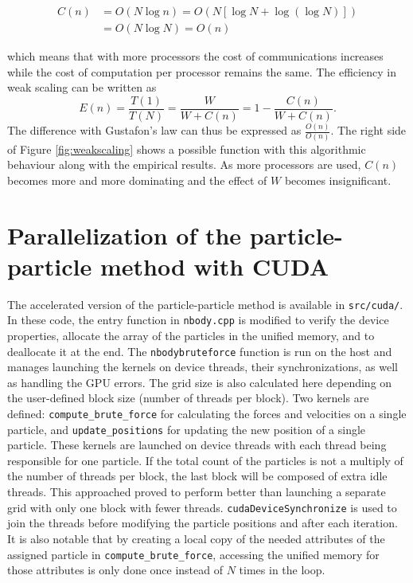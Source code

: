 \documentclass[10pt,journal,compsocconf]{IEEEtran}
\newcommand{\code}[1]{{\small \texttt{#1}}}
\begin{document}
\begin{equation*}
  \begin{aligned}
    C(n) & = O(N \log n) = O(N [\log N + \log(\log N)]) \\
    & = O(N \log N) = O(n)
  \end{aligned}
\end{equation*}

which means that with more processors the cost of communications increases while the cost of computation per processor remains the same. The efficiency in weak scaling can be written as
\begin{equation*}
  E(n) = \frac{T(1)}{T(N)} = \frac{W}{W + C(n)} = 1 - \frac{C(n)}{W + C(n)}.
\end{equation*}
The difference with Gustafon's law can thus be expressed as $\frac{O(n)}{O(n)}$. The right side of Figure \ref{fig:weakscaling} shows a possible function with this algorithmic behaviour along with the empirical results. As more processors are used, $C(n)$ becomes more and more dominating and the effect of $W$ becomes insignificant.

\section{Parallelization of the particle-particle method with CUDA}

The accelerated version of the particle-particle method is available in \code{src/cuda/}. In these code, the entry function in \code{nbody.cpp} is modified to verify the device properties, allocate the array of the particles in the unified memory, and to deallocate it at the end. The \code{nbodybruteforce} function is run on the host and manages launching the kernels on device threads, their synchronizations, as well as handling the GPU errors. The grid size is also calculated here depending on the user-defined block size (number of threads per block). Two kernels are defined: \code{compute\_brute\_force} for calculating the forces and velocities on a single particle, and \code{update\_positions} for updating the new position of a single particle. These kernels are launched on device threads with each thread being responsible for one particle. If the total count of the particles is not a multiply of the number of threads per block, the last block will be composed of extra idle threads. This approached proved to perform better than launching a separate grid with only one block with fewer threads. \code{cudaDeviceSynchronize} is used to join the threads before modifying the particle positions and after each iteration. It is also notable that by creating a local copy of the needed attributes of the assigned particle in \code{compute\_brute\_force}, accessing the unified memory for those attributes is only done once instead of $N$ times in the loop.
\end{document}
